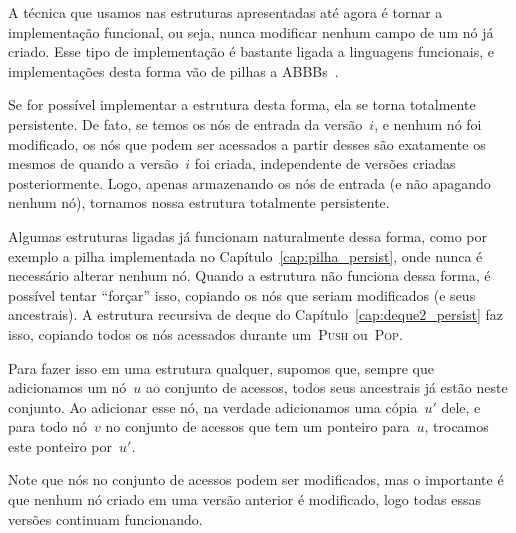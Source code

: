\documentclass[main.tex]{subfiles}
\begin{document}
A técnica que usamos nas estruturas apresentadas até agora é tornar a implementação funcional, ou seja, nunca modificar nenhum campo de um nó já criado. Esse tipo de implementação é bastante ligada a linguagens funcionais, e implementações desta forma vão de pilhas a ABBBs~\cite{HoodMelville,KaplanT1999,Myers83,Myers84}.

Se for possível implementar a estrutura desta forma, ela se torna totalmente persistente. De fato, se temos os nós de entrada da versão~$i$, e nenhum nó foi modificado, os nós que podem ser acessados a partir desses são exatamente os mesmos de quando a versão~$i$ foi criada, independente de versões criadas posteriormente. Logo, apenas armazenando os nós de entrada (e não apagando nenhum nó), tornamos nossa estrutura totalmente persistente.

Algumas estruturas ligadas já funcionam naturalmente dessa forma, como por exemplo a pilha implementada no Capítulo~\ref{cap:pilha_persist}, onde nunca é necessário alterar nenhum nó. Quando a estrutura não funciona dessa forma, é possível tentar ``forçar'' isso, copiando os nós que seriam modificados (e seus ancestrais). A estrutura recursiva de deque do Capítulo~\ref{cap:deque2_persist} faz isso, copiando todos os nós acessados durante um~\textsc{Push} ou~\textsc{Pop}.

Para fazer isso em uma estrutura qualquer, supomos que, sempre que adicionamos um nó~$u$ ao conjunto de acessos, todos seus ancestrais já estão neste conjunto. Ao adicionar esse nó, na verdade adicionamos uma cópia~$u'$ dele, e para todo nó~$v$ no conjunto de acessos que tem um ponteiro para~$u$, trocamos este ponteiro por~$u'$.

Note que nós no conjunto de acessos podem ser modificados, mas o importante é que nenhum nó criado em uma versão anterior é modificado, logo todas essas versões continuam funcionando.
\end{document}
